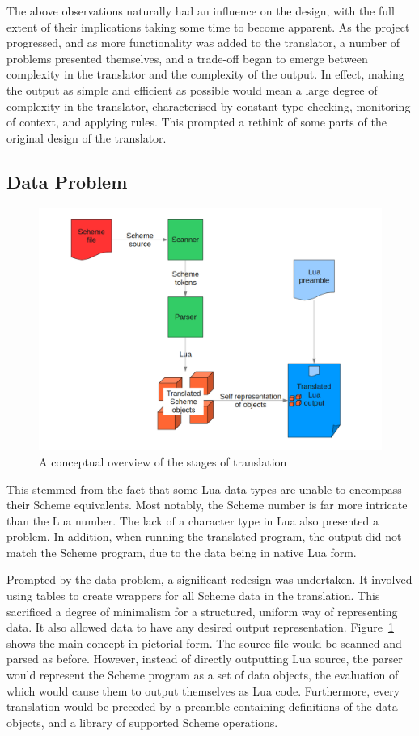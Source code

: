 The above observations naturally had an influence on the design, with the full
extent of their implications taking some time to become apparent. As the project
progressed, and as more functionality was added to the translator, a number of
problems presented themselves, and a trade-off began to emerge between
complexity in the translator and the complexity of the output. In effect, making
the output as simple and efficient as possible would mean a large degree of
complexity in the translator, characterised by constant type checking,
monitoring of context, and applying rules. This prompted a rethink of some parts
of the original design of the translator.

\subsection{Data Problem}

\begin{figure}
\centering
\includegraphics[width=\textwidth]{overview.png}
\caption{A conceptual overview of the stages of translation}
\label{fig:overview}
\end{figure}

This stemmed from the fact that some Lua data types are unable to encompass
their Scheme equivalents. Most notably, the Scheme number is far more intricate
than the Lua number. The lack of a character type in Lua also presented a
problem. In addition, when running the translated program, the output did not
match the Scheme program, due to the data being in native Lua form.

Prompted by the data problem, a significant redesign was undertaken. It involved
using tables to create wrappers for all Scheme data in the translation. This
sacrificed a degree of minimalism for a structured, uniform way of representing
data. It also allowed data to have any desired output representation.
Figure~\ref{fig:overview} shows the main concept in pictorial form. The source
file would be scanned and parsed as before. However, instead of directly
outputting Lua source, the parser would represent the Scheme program as a set of
data objects, the evaluation of which would cause them to output themselves as
Lua code. Furthermore, every translation would be preceded by a preamble
containing definitions of the data objects, and a library of supported Scheme
operations.

